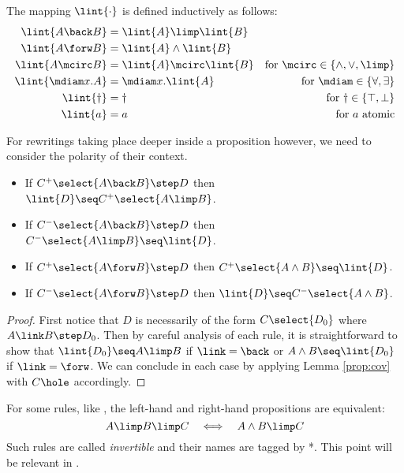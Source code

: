 \begin{definition}
  The mapping $\lint{\cdot}$ is defined inductively as follows:
  \begin{align*}
    \lint{A \back B} &= \lint{A} \limp \lint{B} & \\
    \lint{A \forw B} &= \lint{A} \land \lint{B} & \\
    \lint{A \mcirc B} &= \lint{A} \mcirc \lint{B} &\text{for $\mcirc \in \{\land, \lor, \limp\}$} \\
    \lint{\mdiam x. A} &= \mdiam x. \lint{A} &\text{for $\mdiam \in \{\forall, \exists\}$} \\
    \lint{\dagger} &= \dagger &\text{for $\dagger \in \{\top, \bot\}$} \\
    \lint{a} &= a &\text{for $a$ atomic} 
  \end{align*}
\end{definition}

For rewritings taking place deeper inside a proposition however, we need to
consider the polarity of their context.


\begin{lemma}\label{lemma:rules-valid-in-context}
  \phantom{a}
  \begin{itemize}
    \item If $C^+\select{A\back B}\step D$ then $\lint{D} \seq C^+\select{A\limp B}$.
    \item If $C^-\select{A\back B} \step D$ then $C^-\select{A\limp B}\seq \lint{D}$.
    \item If $C^+\select{A \forw B} \step D$ then $ C^+\select{A \land B}\seq \lint{D}$.
    \item If $C^-\select{A \forw B} \step D$ then $\lint{D} \seq C^-\select{A \land B}$.
  \end{itemize}
\end{lemma}
\begin{proof}
  First notice that $D$ is necessarily of the form $C\select{D_0}$ where $A
  \link B \step D_0$. Then by careful analysis of each rule, it is
  straightforward to show that $\lint{D_0} \seq A \limp B$ if $\link = \back$ or
  $A \land B \seq \lint{D_0}$ if $\link = \forw$. We can conclude in each case
  by applying Lemma \ref{prop:cov} with $C\hole$ accordingly.
\end{proof}
\begin{remark}
  For some rules, like , the left-hand and
  right-hand propositions are equivalent:
  $$A \limp B \limp C ~~~\Longleftrightarrow~~~ A \land B \limp C$$ Such rules are
  called {\em invertible} and their names are tagged by *. This point will be
  relevant in .
\end{remark}



